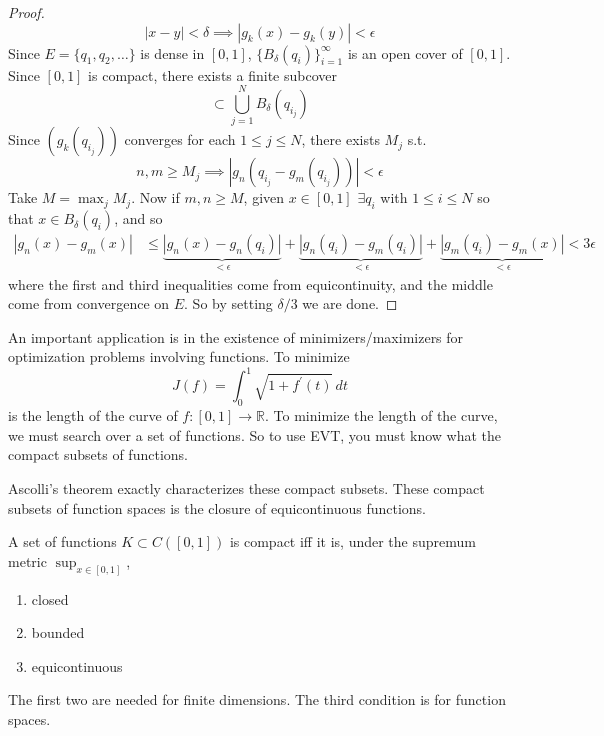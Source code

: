 \begin{proof}
\begin{equation}
      |x - y| < \delta \implies |g_k (x) - g_k (y)| < \epsilon
    \end{equation} 
    Since $E = \{q_1, q_2, \ldots \}$ is dense in $[0, 1]$, $\{B_\delta (q_i) \}_{i=1}^\infty$ is an open cover of $[0, 1]$. Since $[0, 1]$ is compact, there exists a finite subcover 
    \begin{equation}
      [0, 1] \subset \bigcup_{j=1}^N B_{\delta} (q_{i_j})
    \end{equation}
    Since $(g_k (q_{i_j}))$ converges for each $1 \leq j \leq N$, there exists $M_j$ s.t. 
    \begin{equation}
      n, m \geq M_j \implies |g_n (q_{i_j} - g_m (q_{i_j}))| < \epsilon
    \end{equation}
    Take $M = \max_j M_j$. Now if $m, n \geq M$, given $x \in [0, 1]$ $\exists q_i$ with $1 \leq i \leq N$ so that $x \in B_\delta (q_i)$, and so 
    \begin{align}
      |g_n (x) - g_m (x)| & \leq \underbrace{| g_n (x) - g_n (q_i)|}_{< \epsilon} + \underbrace{| g_n (q_i) - g_m (q_i)|}_{< \epsilon} + \underbrace{|g_m (q_i) - g_m (x)|}_{< \epsilon} < 3\epsilon
    \end{align}
    where the first and third inequalities come from equicontinuity, and the middle come from convergence on $E$. So by setting $\delta/3$ we are done. 
  \end{proof}

  \begin{example}
    An important application is in the existence of minimizers/maximizers for optimization problems involving functions. To minimize 
    \begin{equation}
      J(f) = \int_0^1 \sqrt{1 + f^\prime (t)} \,dt 
    \end{equation}
    is the length of the curve of $f: [0, 1] \to \mathbb{R}$. To minimize the length of the curve, we must search over a set of functions. So to use EVT, you must know what the compact subsets of functions. 
  \end{example}

  Ascolli's theorem exactly characterizes these compact subsets. These compact subsets of function spaces is the closure of equicontinuous functions. 

  \begin{corollary}
    A set of functions $K \subset C([0, 1])$ is compact iff it is, under the supremum metric $\sup_{x \in [0, 1]}$, 
    \begin{enumerate}
      \item closed 
      \item bounded 
      \item equicontinuous
    \end{enumerate}
    The first two are needed for finite dimensions. The third condition is for function spaces. 
  \end{corollary}

